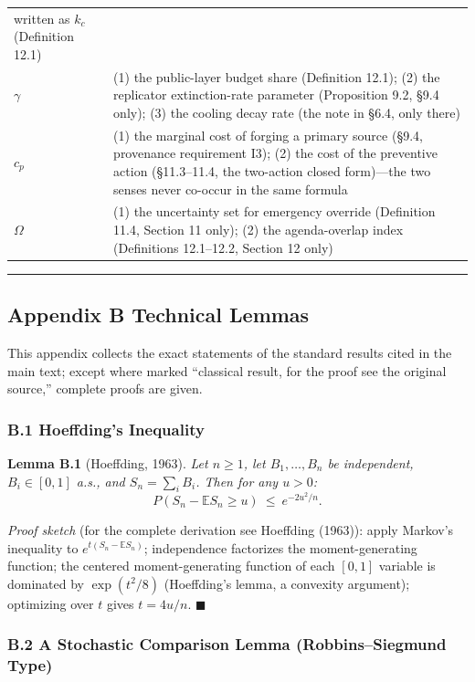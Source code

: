 \documentclass[
  11pt]{article}
\begin{document}
\begin{longtable}[]{@{}
  >{\raggedright\arraybackslash}p{}
  >{\raggedright\arraybackslash}p{}@{}}
written as \(k_c\) (Definition 12.1) \\
\(\gamma\) & (1) the public-layer budget share (Definition 12.1); (2)
the replicator extinction-rate parameter (Proposition 9.2, §9.4 only);
(3) the cooling decay rate (the note in §6.4, only there) \\
\(c_p\) & (1) the marginal cost of forging a primary source (§9.4,
provenance requirement I3); (2) the cost of the preventive action
(§11.3--11.4, the two-action closed form)---the two senses never
co-occur in the same formula \\
\(\Omega\) & (1) the uncertainty set for emergency override (Definition
11.4, Section 11 only); (2) the agenda-overlap index (Definitions
12.1--12.2, Section 12 only) \\
\end{longtable}

\begin{center}\rule{0.5\linewidth}{0.5pt}\end{center}

\subsection{Appendix B Technical
Lemmas}\label{appendix-b-technical-lemmas}

This appendix collects the exact statements of the standard results
cited in the main text; except where marked ``classical result, for the
proof see the original source,'' complete proofs are given.

\subsubsection{B.1 Hoeffding's
Inequality}\label{b.1-hoeffdings-inequality}

\textbf{Lemma B.1} (Hoeffding, 1963). \emph{Let \(n\ge1\), let
\(B_1,\dots,B_n\) be independent, \(B_i \in [0,1]\) a.s., and
\(S_n = \sum_i B_i\). Then for any \(u > 0\):}
\[P(S_n - \mathbb{E}S_n \ge u) \ \le\ e^{-2u^2/n}.\]

\emph{Proof sketch} (for the complete derivation see Hoeffding (1963)):
apply Markov's inequality to \(e^{t(S_n - \mathbb{E}S_n)}\);
independence factorizes the moment-generating function; the centered
moment-generating function of each \([0,1]\) variable is dominated by
\(\exp(t^2/8)\) (Hoeffding's lemma, a convexity argument); optimizing
over \(t\) gives \(t = 4u/n\). \(\blacksquare\)

\subsubsection{B.2 A Stochastic Comparison Lemma (Robbins--Siegmund
Type)}\label{b.2-a-stochastic-comparison-lemma-robbinssiegmund-type}
\end{document}
